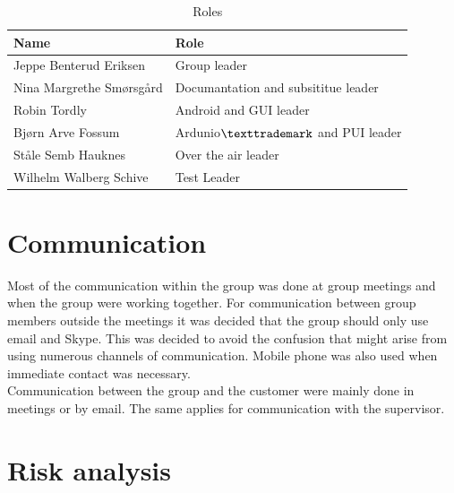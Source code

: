 \begin{table}
\begin{tabular}{|l|l|}
\hline
	{\bf Name} & {\bf Role}\\
\hline
	Jeppe Benterud Eriksen & Group leader\\
\hline
	Nina Margrethe Smørsgård & Documantation and subsititue leader\\
\hline
	Robin Tordly & Android and GUI leader\\
\hline
	Bjørn Arve Fossum & Ardunio$\texttrademark$ and PUI leader\\
\hline
	Ståle Semb Hauknes & Over the air leader\\
\hline
	Wilhelm Walberg Schive & Test Leader\\
\hline
\end{tabular}
\caption{Roles}
\end{table}

\section{Communication}
Most of the communication within the group was done at group meetings and when the group were working together. For communication between group members outside the meetings it was decided that the group should only use email and Skype. This was decided to avoid the confusion that might arise from using numerous channels of communication. Mobile phone was also used when immediate contact was necessary.\\
\newline
Communication between the group and the customer were mainly done in meetings or by email. The same applies for communication with the supervisor.

\section{Risk analysis}

